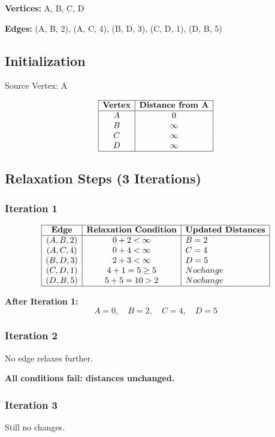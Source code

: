 \documentclass[14pt,a4paper]{extarticle}
\begin{document}
\textbf{Vertices:} A, B, C, D

\textbf{Edges:} (A, B, 2), (A, C, 4), (B, D, 3), (C, D, 1), (D, B, 5)

\subsection*{Initialization}

Source Vertex: A

\[
\begin{array}{|c|c|}
\hline
\textbf{Vertex} & \textbf{Distance from A} \\
\hline
A & 0 \\
B & \infty \\
C & \infty \\
D & \infty \\
\hline
\end{array}
\]

\subsection*{Relaxation Steps (3 Iterations)}

\subsubsection*{Iteration 1}
\[
\begin{array}{|c|c|l|}
\hline
\textbf{Edge} & \textbf{Relaxation Condition} & \textbf{Updated Distances} \\
\hline
(A, B, 2) & 0 + 2 < \infty & B = 2 \\
(A, C, 4) & 0 + 4 < \infty & C = 4 \\
(B, D, 3) & 2 + 3 < \infty & D = 5 \\
(C, D, 1) & 4 + 1 = 5 \geq 5 & No change \\
(D, B, 5) & 5 + 5 = 10 > 2 & No change \\
\hline
\end{array}
\]

\textbf{After Iteration 1:}
\[
A = 0, \quad B = 2, \quad C = 4, \quad D = 5
\]

\subsubsection*{Iteration 2}
No edge relaxes further.

\textbf{All conditions fail: distances unchanged.}

\subsubsection*{Iteration 3}
Still no changes.
\end{document}
